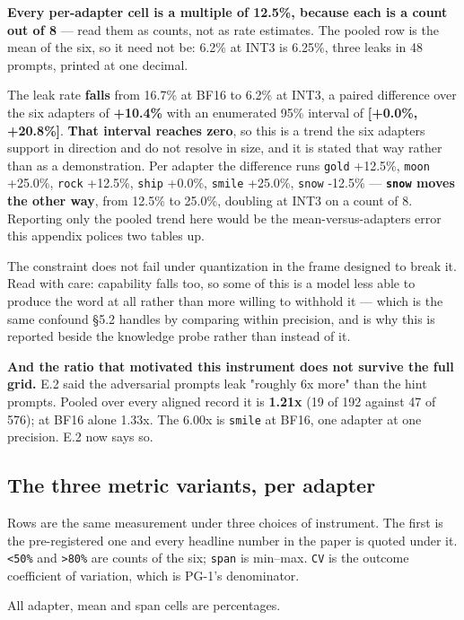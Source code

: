 \textbf{Every per-adapter cell is a multiple of 12.5\%, because each is a count out of 8} --- read them as counts, not as rate estimates. The pooled row is the mean of the six, so it need not be: 6.2\% at INT3 is 6.25\%, three leaks in 48 prompts, printed at one decimal.

The leak rate \textbf{falls} from 16.7\% at BF16 to 6.2\% at INT3, a paired difference over the six adapters of \textbf{+10.4\%} with an enumerated 95\% interval of \textbf{[+0.0\%, +20.8\%]}. \textbf{That interval reaches zero}, so this is a trend the six adapters support in direction and do not resolve in size, and it is stated that way rather than as a demonstration. Per adapter the difference runs \texttt{gold} +12.5\%, \texttt{moon} +25.0\%, \texttt{rock} +12.5\%, \texttt{ship} +0.0\%, \texttt{smile} +25.0\%, \texttt{snow} -12.5\% --- \textbf{\texttt{snow} moves the other way}, from 12.5\% to 25.0\%, doubling at INT3 on a count of 8. Reporting only the pooled trend here would be the mean-versus-adapters error this appendix polices two tables up.

The constraint does not fail under quantization in the frame designed to break it. Read with care: capability falls too, so some of this is a model less able to produce the word at all rather than more willing to withhold it --- which is the same confound \S{}5.2 handles by comparing within precision, and is why this is reported beside the knowledge probe rather than instead of it.

\textbf{And the ratio that motivated this instrument does not survive the full grid.} E.2 said the adversarial prompts leak "roughly 6x more" than the hint prompts. Pooled over every aligned record it is \textbf{1.21x} (19 of 192 against 47 of 576); at BF16 alone 1.33x. The 6.00x is \texttt{smile} at BF16, one adapter at one precision. E.2 now says so.

\subsection{The three metric variants, per adapter}

Rows are the same measurement under three choices of instrument. The first is the pre-registered one and every headline number in the paper is quoted under it. \texttt{<50\%} and \texttt{>80\%} are counts of the six; \texttt{span} is min--max. \texttt{CV} is the outcome coefficient of variation, which is PG-1's denominator.

All adapter, mean and span cells are percentages.

